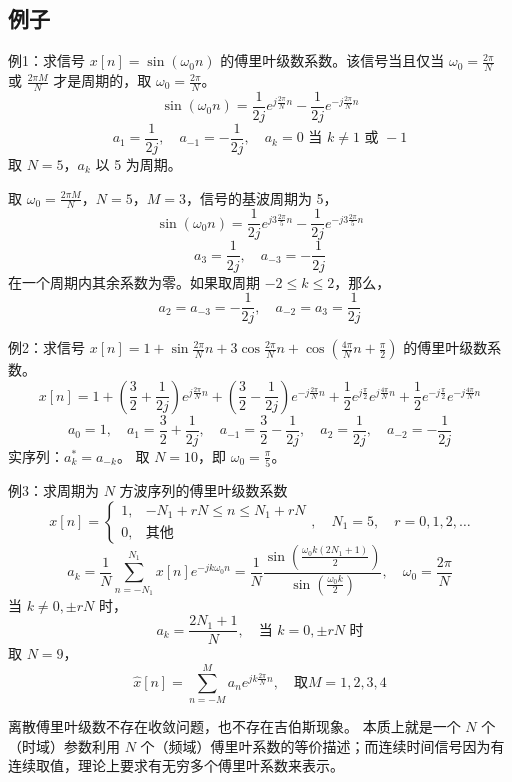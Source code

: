 \documentclass[UTF8]{report}
\theoremstyle{MyLineTheoremStyle} %
\theoremstyle{MyBlockTheoremStyle} %
\theoremstyle{MySubsubsectionStyle} %
\begin{document}
\subsection{例子}
例1：求信号 $x[n] = \sin(\omega_0 n)$ 的傅里叶级数系数。该信号当且仅当 $\omega_0 = \frac{2\pi}{N}$ 或 $\frac{2\pi M}{N}$ 才是周期的，取 $\omega_0 = \frac{2\pi}{N}$。
\[
\sin(\omega_0 n) = \frac{1}{2j} e^{j \frac{2\pi}{N} n} - \frac{1}{2j} e^{-j \frac{2\pi}{N} n}
\]
\[
a_1 = \frac{1}{2j}, \quad a_{-1} = -\frac{1}{2j}, \quad a_k = 0 \text{ 当 } k \neq 1 \text{ 或 } -1
\]
取 $N = 5$，$a_k$ 以 5 为周期。

取 $\omega_0 = \frac{2\pi M}{N}$，$N = 5$，$M = 3$，信号的基波周期为 5，
\[
\sin(\omega_0 n) = \frac{1}{2j} e^{j3 \frac{2\pi}{5} n} - \frac{1}{2j} e^{-j3 \frac{2\pi}{5} n}
\]
\[
a_3 = \frac{1}{2j}, \quad a_{-3} = -\frac{1}{2j}
\]
在一个周期内其余系数为零。如果取周期 $-2 \leq k \leq 2$，那么，
\[
a_2 = a_{-3} = -\frac{1}{2j}, \quad a_{-2} = a_3 = \frac{1}{2j}
\]

例2：求信号 $x[n] = 1 + \sin \frac{2\pi}{N} n + 3 \cos \frac{2\pi}{N} n + \cos \left( \frac{4\pi}{N} n + \frac{\pi}{2} \right)$ 的傅里叶级数系数。
\[
x[n] = 1 + (\frac{3}{2} + \frac{1}{2j}) e^{j \frac{2\pi}{N} n} + (\frac{3}{2} - \frac{1}{2j}) e^{-j \frac{2\pi}{N} n} + \frac{1}{2} e^{j \frac{\pi}{2}} e^{j \frac{4\pi}{N} n} + \frac{1}{2} e^{-j\frac{\pi}{2}}e^{-j \frac{4\pi}{N} n}
\]
\[
a_0 = 1, \quad a_1 = \frac{3}{2} + \frac{1}{2j}, \quad a_{-1} = \frac{3}{2} - \frac{1}{2j}, \quad a_2 = \frac{1}{2j}, \quad a_{-2} = -\frac{1}{2j}
\]
实序列：$a_k^* = a_{-k}$。
取 $N = 10$，即 $\omega_0 = \frac{\pi}{5}$。

例3：求周期为 $N$ 方波序列的傅里叶级数系数
\[
x[n] = \begin{cases}
1, & -N_1 + rN \leq n \leq N_1 + rN \\
0, & \text{其他}
\end{cases}, \quad N_1 = 5, \quad r = 0,1,2, \ldots
\]
\[
a_k = \frac{1}{N} \sum_{n=-N_1}^{N_1} x[n] e^{-jk\omega_0 n} = \frac{1}{N} \frac{\sin \left( \frac{\omega_0 k (2N_1 + 1)}{2} \right)}{\sin \left( \frac{\omega_0 k}{2} \right)}, \quad \omega_0 = \frac{2\pi}{N}
\]
当 $k \neq 0, \pm rN$ 时，
\[
a_k = \frac{2N_1+1}{N}, \quad \text{当 } k = 0, \pm rN \text{ 时}
\]
取 $N = 9$，
\[
\hat{x}[n] = \sum_{n=-M}^{M} a_n e^{jk \frac{2\pi}{N} n}, \quad \text{取} M = 1,2,3,4
\]

离散傅里叶级数不存在收敛问题，也不存在吉伯斯现象。
本质上就是一个 $N$ 个（时域）参数利用 $N$ 个（频域）傅里叶系数的等价描述；而连续时间信号因为有连续取值，理论上要求有无穷多个傅里叶系数来表示。
\end{document}

